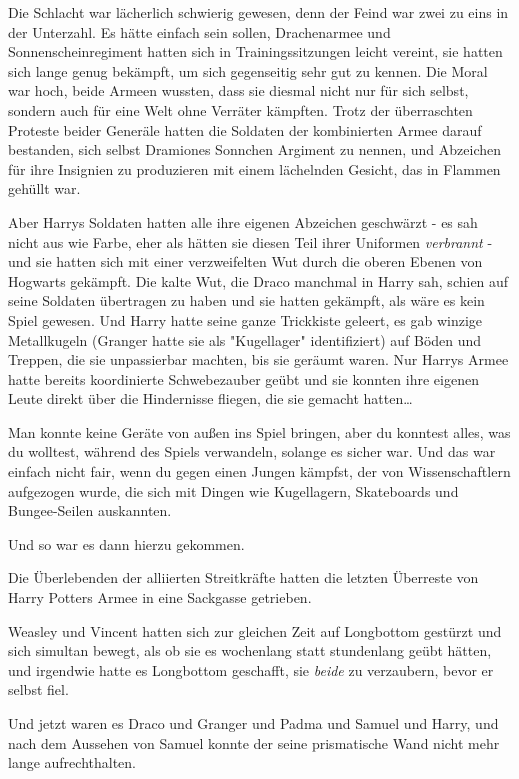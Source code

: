 {Die Schlacht war lächerlich schwierig gewesen, denn der Feind war zwei zu eins in der Unterzahl. Es hätte einfach sein sollen, Drachenarmee und Sonnenscheinregiment hatten sich in Trainingssitzungen leicht vereint, sie hatten sich lange genug bekämpft, um sich gegenseitig sehr gut zu kennen. Die Moral war hoch, beide Armeen wussten, dass sie diesmal nicht nur für sich selbst, sondern auch für eine Welt ohne Verräter kämpften. Trotz der überraschten Proteste beider Generäle hatten die Soldaten der kombinierten Armee darauf bestanden, sich selbst Dramiones Sonnchen Argiment zu nennen, und Abzeichen für ihre Insignien zu produzieren mit einem lächelnden Gesicht, das in Flammen gehüllt war.

Aber Harrys Soldaten hatten alle ihre eigenen Abzeichen geschwärzt - es sah nicht aus wie Farbe, eher als hätten sie diesen Teil ihrer Uniformen \emph{verbrannt} - und sie hatten sich mit einer verzweifelten Wut durch die oberen Ebenen von Hogwarts gekämpft. Die kalte Wut, die Draco manchmal in Harry sah, schien auf seine Soldaten übertragen zu haben und sie hatten gekämpft, als wäre es kein Spiel gewesen. Und Harry hatte seine ganze Trickkiste geleert, es gab winzige Metallkugeln (Granger hatte sie als "Kugellager" identifiziert) auf Böden und Treppen, die sie unpassierbar machten, bis sie geräumt waren. Nur Harrys Armee hatte bereits koordinierte Schwebezauber geübt und sie konnten ihre eigenen Leute direkt über die Hindernisse fliegen, die sie gemacht hatten…

Man konnte keine Geräte von außen ins Spiel bringen, aber du konntest alles, was du wolltest, während des Spiels verwandeln, solange es sicher war. Und das war einfach nicht fair, wenn du gegen einen Jungen kämpfst, der von Wissenschaftlern aufgezogen wurde, die sich mit Dingen wie Kugellagern, Skateboards und Bungee-Seilen auskannten.

Und so war es dann hierzu gekommen.

Die Überlebenden der alliierten Streitkräfte hatten die letzten Überreste von Harry Potters Armee in eine Sackgasse getrieben.

Weasley und Vincent hatten sich zur gleichen Zeit auf Longbottom gestürzt und sich simultan bewegt, als ob sie es wochenlang statt stundenlang geübt hätten, und irgendwie hatte es Longbottom geschafft, sie \emph{beide} zu verzaubern, bevor er selbst fiel.

Und jetzt waren es Draco und Granger und Padma und Samuel und Harry, und nach dem Aussehen von Samuel konnte der seine prismatische Wand nicht mehr lange aufrechthalten.

}
